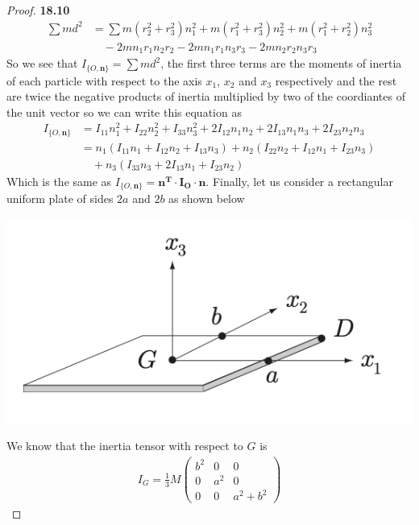 \documentclass[11pt]{article}
\theoremstyle{definition}
\begin{document}
\begin{proof}{\textbf{18.10}}
    \begin{align*}
        \sum md^2 &= \sum m(r_2^2 + r_3^2)n_1^2 + m(r_1^2+ r_3^2)n_2^2 +
        m(r_1^2 + r_2^2)n_3^2 \\
        &\quad - 2mn_1r_1n_2r_2 - 2mn_1r_1n_3r_3 - 2mn_2r_2n_3r_3
    \end{align*}
    So we see that $I_{\{O,\bm{n}\}} = \sum md^2$, the first three terms are
    the moments of inertia of each particle with respect to the axis $x_1$,
    $x_2$ and $x_3$ respectively and the rest are twice the negative products
    of inertia multiplied by two of the coordiantes of the unit vector
    so we can write this equation as
    \begin{align*}
        I_{\{O,\bm{n}\}} &= I_{11}n_1^2 + I_{22}n_2^2 + I_{33}n_3^2
        + 2I_{12}n_1n_2 + 2I_{13}n_1n_3 + 2I_{23}n_2n_3\\
        &= n_1(I_{11}n_1 + I_{12}n_2 + I_{13}n_3)
        + n_2(I_{22}n_2 + I_{12}n_1 + I_{23}n_3)\\
        &\quad+ n_3(I_{33}n_3 + 2I_{13}n_1 + I_{23}n_2)
    \end{align*}
    Which is the same as $I_{\{O,\bm{n}\}} = \bm{n^T \cdot I_O \cdot n}$.
\cleardoublepage
    Finally, let us consider a rectangular uniform plate of sides $2a$ and $2b$
    as shown below
    \begin{center}
        \includegraphics[scale=0.4]{ch18-10-2.png}
    \end{center}
    We know that the inertia tensor with respect to $G$ is
    \begin{align*}
        I_G = \frac{1}{3}M\begin{pmatrix}
            b^2 & 0 & 0\\
            0 & a^2 & 0\\
            0 & 0 & a^2 + b^2
        \end{pmatrix}
    \end{align*}

\end{proof}
\end{document}
